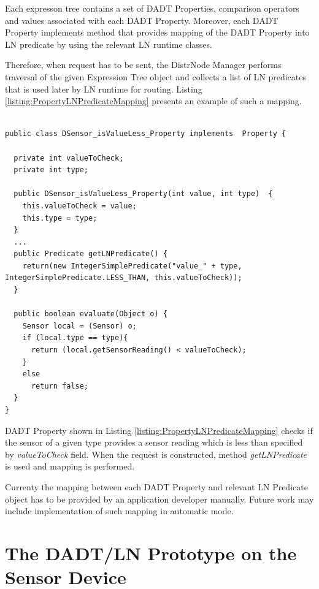 Each expresson tree contains a set of DADT Properties, comparison operators
and values associated with each DADT Property. Moreover,
each DADT Property implements method that provides mapping of the DADT
Property into LN predicate by using the relevant LN runtime classes. 

Therefore, when request has to be sent, the DistrNode Manager performs traversal
of the given Expression Tree object and collects a list of LN predicates that
is used later by LN runtime for routing. Listing
\ref{listing:PropertyLNPredicateMapping} presents an example of such a mapping.

\begin{lstlisting}[frame=trbl, basewidth={0.55em, 0.6em}, captionpos=b, 
basicstyle=\ttfamily\footnotesize, breaklines, caption = Mapping DADT Property to LN predicate  label = listing:PropertyLNPredicateMapping]

public class DSensor_isValueLess_Property implements  Property {

  private int valueToCheck;
  private int type;

  public DSensor_isValueLess_Property(int value, int type)  {
    this.valueToCheck = value;
    this.type = type;
  }
  ...
  public Predicate getLNPredicate() {
    return(new IntegerSimplePredicate("value_" + type, IntegerSimplePredicate.LESS_THAN, this.valueToCheck));
  }

  public boolean evaluate(Object o) {
    Sensor local = (Sensor) o;
    if (local.type == type){
      return (local.getSensorReading() < valueToCheck);	
    }
    else 
      return false;
  }
}
\end{lstlisting} 

DADT Property shown in Listing \ref{listing:PropertyLNPredicateMapping}
checks if the sensor of a given type provides a sensor reading which is less than specified by \emph{valueToCheck} field. 
When the request is constructed, method \emph{getLNPredicate} is used and
mapping is performed. 

Currenty the mapping between each DADT Property and relevant LN Predicate
object has to be provided by an application developer manually. Future work may
include implementation of such mapping in automatic mode.

\section{The DADT/LN Prototype on the Sensor Device} \label{subsubsec:DADTLNSensorDevice}

